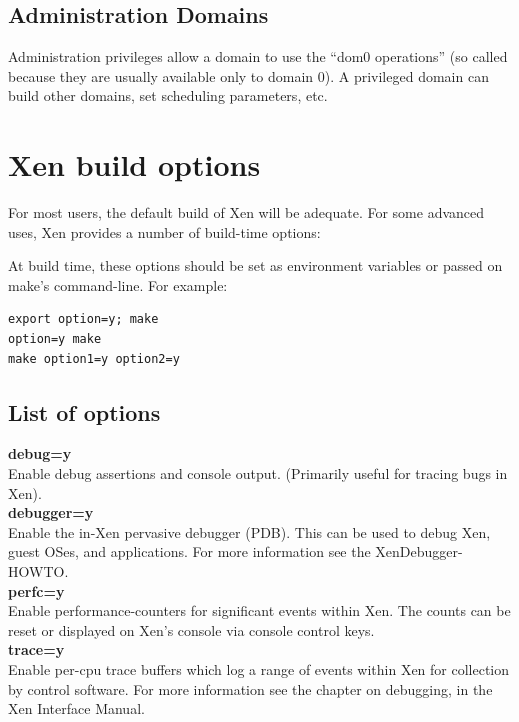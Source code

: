\documentclass[11pt,twoside,final,openright]{xenstyle}
\begin{document}
{\section{Administration Domains}

Administration privileges allow a domain to use the ``dom0
operations'' (so called because they are usually available only to
domain 0).  A privileged domain can build other domains, set scheduling
parameters, etc.


\chapter{Xen build options}

For most users, the default build of Xen will be adequate.  For some
advanced uses, Xen provides a number of build-time options:

At build time, these options should be set as environment variables or
passed on make's command-line.  For example:

\begin{verbatim}
export option=y; make
option=y make
make option1=y option2=y
\end{verbatim}

\section{List of options}

{\bf debug=y }\\
Enable debug assertions and console output.
(Primarily useful for tracing bugs in Xen).        \\
{\bf debugger=y }\\
Enable the in-Xen pervasive debugger (PDB).
This can be used to debug Xen, guest OSes, and
applications. For more information see the 
XenDebugger-HOWTO.                                 \\
{\bf perfc=y }\\
Enable performance-counters for significant events
within Xen. The counts can be reset or displayed
on Xen's console via console control keys.          \\
{\bf trace=y }\\
Enable per-cpu trace buffers which log a range of
events within Xen for collection by control
software.  For more information see the chapter on debugging,
in the Xen Interface Manual.

}
\end{document}
